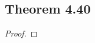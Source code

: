 \documentclass[../../main.tex]{subfiles}
\begin{document}
\subsection{Theorem 4.40}
\begin{wts}

\end{wts}
\begin{proof}

\end{proof}
\end{document}
